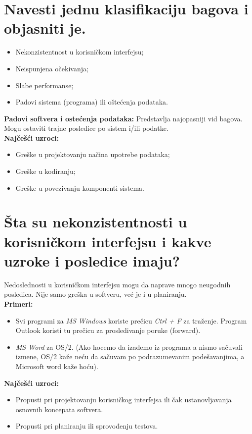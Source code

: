 \documentclass[a4paper]{article}
\begin{document}
\section{Navesti jednu klasifikaciju bagova i objasniti je.}
  \begin{itemize}
    \item Nekonzistentnost u korisničkom interfejsu;
    \item Neispunjena očekivanja;
    \item Slabe performanse;
    \item Padovi sistema (programa) ili oštećenja podataka.
  \end{itemize}

  \textbf{Padovi softvera i ostećenja podataka:} Predstavlja
  najopasniji vid bagova. Mogu ostaviti trajne posledice po sistem i/ili podatke.\\
  \textbf{Najčešći uzroci:}
  \begin{itemize}
    \item Greške u projektovanju načina upotrebe podataka;
    \item Greške u kodiranju;
    \item Greške u povezivanju komponenti sistema.
  \end{itemize}

\section{Šta su nekonzistentnosti u korisničkom interfejsu i kakve
uzroke i posledice imaju?}
  Nedoslednosti u korisničkom interfejsu mogu da naprave mnogo neugodnih posledica.
  Nije samo greška u softveru, već je i u planiranju. \\
  \textbf{Primeri:}
  \begin{itemize}
    \item Svi programi za \textit{MS Windows} koriste prečicu \textit{Ctrl + F} za traženje. 
          Program Outlook koristi tu prečicu za prosledivanje poruke (forward).
    \item \textit{MS Word} za OS/2. (Ako hocemo da izađemo iz programa a nismo sačuvali izmene, 
          OS/2 kaže neću da sačuvam po podrazumevanim podešavanjima, a Microsoft word kaže hoću).
  \end{itemize}
  \textbf{Najčešći uzroci:}
  \begin{itemize}
    \item Propusti pri projektovanju korisničkog interfejsa ili čak ustanovljavanja osnovnih 
          koncepata softvera.
    \item Propusti pri planiranju ili sprovođenju testova.
  \end{itemize}
\end{document}
